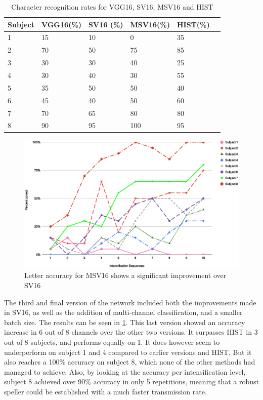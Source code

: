 \documentclass[conference]{IEEEtran}
\begin{document}
\begin{table}[h]
\centering
\begin{tabular}{ |p{1cm}||p{1cm}|p{1cm}|p{1cm}|p{1cm}|p{1cm}| }
 \hline
 Subject & VGG16(\%) & SV16 (\%)  & MSV16(\%) & HIST(\%)\\
 \hline
 1 & 15 & 10 & 0 & 35\\
 2 & 70 & 50 & 75 & 85\\
 3 & 30 & 30 & 40 & 25\\
 4 & 30 & 40 & 30 & 55\\
 5 & 35 & 50 & 50 & 40\\
 6 & 45 & 40 & 50 & 60\\
 7 & 70 & 65 & 80 & 80\\
 8 & 90 & 95 & 100 & 95\\
 \hline
\end{tabular}
\caption[MSV16 accuracy comparison]{Character recognition rates for VGG16, SV16, MSV16 and HIST}
\label{tab:resultsv1v2v3}
\end{table}
\begin{figure}[h]
  \centering
  \includegraphics[width=\linewidth]{images/v3intensification.eps}
  \caption[MSV16 Letter accuracy]{Letter accuracy for MSV16 shows a significant improvement over SV16}
  \label{image:v3intensification}
\end{figure}
The third and final version of the network included both the improvements made in SV16, as well as the addition of multi-channel classification, and a smaller batch size. The results can be seen in \ref{tab:resultsv1v2v3}. This last version showed an accuracy increase in 6 out of 8 channels over the other two versions. It surpasses HIST in 3 out of 8 subjects, and performs equally on 1. 
It does however seem to underperform on subject 1 and 4 compared to earlier versions and HIST. But it also reaches a 100\% accuracy on subject 8, which none of the other methods had managed to achieve.
Also, by looking at the accuracy per intensification level, subject 8 achieved over 90\% accuracy in only 5 repetitions, meaning that a robust speller could be established with a much faster transmission rate. 
\end{document}
